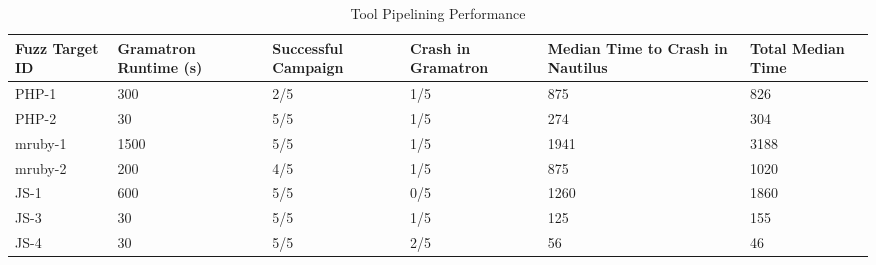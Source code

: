 \begin{table*}[h]
\caption{Tool Pipelining Performance}
\centering
\begin{tabular}{llllll}
\hline
Fuzz Target ID & Gramatron Runtime (s) & Successful Campaign & Crash in Gramatron & Median Time to Crash in Nautilus & Total Median Time \\ \hline
PHP-1          & 300                   & 2/5                 & 1/5                & 875                              & 826               \\
PHP-2          & 30                    & 5/5                 & 1/5                & 274                              & 304               \\
mruby-1        & 1500                  & 5/5                 & 1/5                & 1941                             & 3188              \\
mruby-2        & 200                   & 4/5                 & 1/5                & 875                              & 1020              \\
JS-1           & 600                   & 5/5                 & 0/5                & 1260                             & 1860              \\
JS-3           & 30                    & 5/5                 & 1/5                & 125                              & 155               \\
JS-4           & 30                    & 5/5                 & 2/5                & 56                               & 46                \\ \hline
\end{tabular}
\label{tab:pipeline}
\end{table*}

